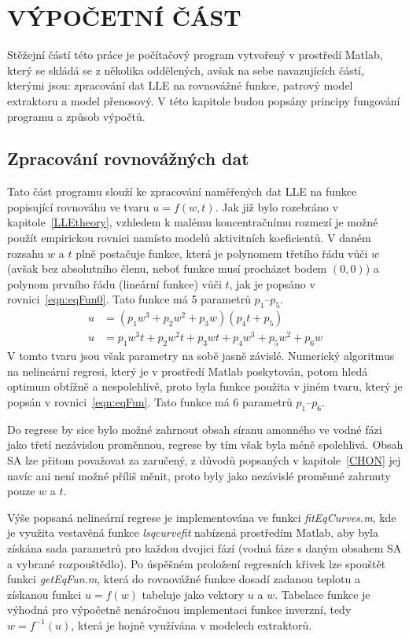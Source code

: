 
\newpage \section{VÝPOČETNÍ ČÁST} \label{comp}
Stěžejní částí této práce je počítačový program vytvořený v prostředí Matlab, který se skládá se z několika oddělených, avšak na sebe navazujících částí, kterými jsou: zpracování dat LLE na rovnovážné funkce, patrový model extraktoru a model přenosový.
V této kapitole budou popsány principy fungování programu a způsob výpočtů.

\subsection{Zpracování rovnovážných dat} \label{compLLE}
Tato část programu slouží ke zpracování naměřených dat LLE na funkce popisující rovnováhu ve tvaru $u = f(w, t)$.
Jak již bylo rozebráno v kapitole~\ref{LLEtheory}, vzhledem k malému koncentračnímu rozmezí je možné použít empirickou rovnici namísto modelů aktivitních koeficientů.
V daném rozsahu $w$ a $t$ plně postačuje funkce, která je polynomem třetího řádu vůči $w$ (avšak bez absolutního členu, neboť funkce musí procházet bodem $(0,0)$) a polynom prvního řádu (lineární funkce) vůči $t$, jak je popsáno v rovnici~\ref{eqn:eqFun0}. Tato funkce má 5 parametrů $p_1$--$p_5$.
\begin{align}
\label{eqn:eqFun0}
	u &= (p_1 w^3 + p_2 w^2 + p_3 w)(p_4 t + p_5) \\
\label{eqn:eqFun}
	u &= p_1 w^3 t + p_2 w^2 t + p_3 w t + p_4 w^3 + p_5 w^2 + p_6 w
\end{align}
V tomto tvaru jsou však parametry na sobě jasně závislé.
Numerický algoritmus na nelineární regresi, který je v prostředí Matlab poskytován, potom hledá optimum obtížně a nespolehlivě, proto byla funkce použita v jiném tvaru, který je popsán v rovnici~\ref{eqn:eqFun}. Tato funkce má 6 parametrů $p_1$--$p_6$.

Do regrese by sice bylo možné zahrnout obsah síranu amonného ve vodné fázi jako třetí nezávislou proměnnou, regrese by tím však byla méně spolehlivá.
Obsah SA lze přitom považovat za zaručený, z důvodů popsaných v kapitole~\ref{CHON} jej navíc ani není možné příliš měnit, proto byly jako nezávislé proměnné zahrnuty pouze $w$ a $t$.

Výše popsaná nelineární regrese je implementována ve funkci \textit{fitEqCurves.m}, kde je využita vestavěná funkce \textit{lsqcurvefit} nabízená prostředím Matlab, aby byla získána sada parametrů pro každou dvojici fází (vodná fáze s daným obsahem SA a vybrané rozpouštědlo).
Po úspěšném proložení regresních křivek lze spouštět funkci \textit{getEqFun.m}, která do rovnovážné funkce dosadí zadanou teplotu a získanou funkci $u = f(w)$ tabeluje jako vektory $u$ a $w$.
Tabelace funkce je výhodná pro výpočetně nenáročnou implementaci funkce inverzní, tedy $w = f^{-1}(u)$, která je hojně využívána v modelech extraktorů.

